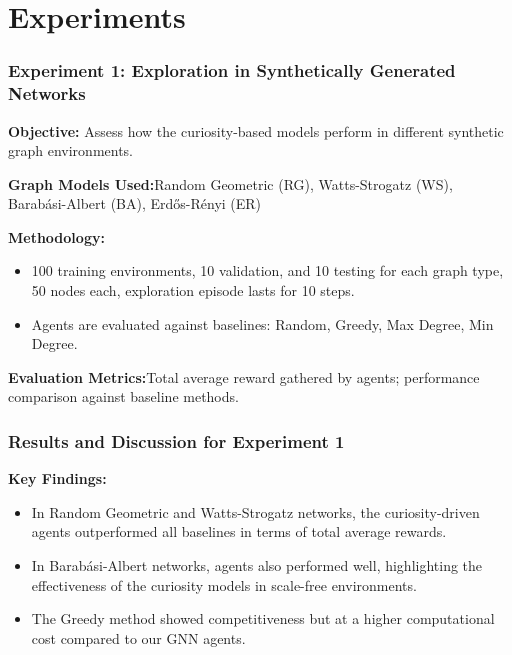\documentclass{beamer}
\begin{document}
\section{Experiments}
\begin{frame}
\frametitle{Experiment 1: Exploration in Synthetically Generated Networks}
\textbf{Objective:} Assess how the curiosity-based models perform in different synthetic graph environments.

\textbf{Graph Models Used:}Random Geometric (RG), Watts-Strogatz (WS), Barabási-Albert (BA), Erdős-Rényi (ER)

\textbf{Methodology:}
\begin{itemize}
    \item 100 training environments, 10 validation, and 10 testing for each graph type, 50 nodes each, exploration episode lasts for 10 steps.
    \item Agents are evaluated against baselines: Random, Greedy, Max Degree, Min Degree.
\end{itemize}

\textbf{Evaluation Metrics:}Total average reward gathered by agents; performance comparison against baseline methods.

\end{frame}

\begin{frame}
\frametitle{Results and Discussion for Experiment 1}
\textbf{Key Findings:}
\begin{itemize}
    \item In Random Geometric and Watts-Strogatz networks, the curiosity-driven agents outperformed all baselines in terms of total average rewards.
    \item In Barabási-Albert networks, agents also performed well, highlighting the effectiveness of the curiosity models in scale-free environments.
    \item The Greedy method showed competitiveness but at a higher computational cost compared to our GNN agents.
\end{itemize}
\end{frame}
\end{document}

